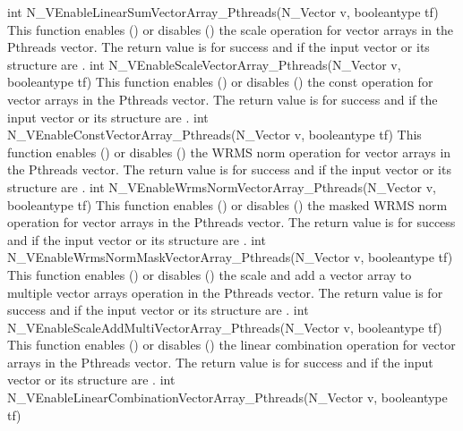 {
  int N\_VEnableLinearSumVectorArray\_Pthreads(N\_Vector v, booleantype tf)
}
{
  This function enables () or disables () the scale
  operation for vector arrays in the Pthreads vector. The return value is  for
  success and  if the input vector or its  structure are .
}
{
  int N\_VEnableScaleVectorArray\_Pthreads(N\_Vector v, booleantype tf)
}
{
  This function enables () or disables () the const
  operation for vector arrays in the Pthreads vector. The return value is  for
  success and  if the input vector or its  structure are .
}
{
  int N\_VEnableConstVectorArray\_Pthreads(N\_Vector v, booleantype tf)
}
{
  This function enables () or disables () the WRMS norm
  operation for vector arrays in the Pthreads vector. The return value is  for
  success and  if the input vector or its  structure are .
}
{
  int N\_VEnableWrmsNormVectorArray\_Pthreads(N\_Vector v, booleantype tf)
}
{
  This function enables () or disables () the masked WRMS
  norm operation for vector arrays in the Pthreads vector. The return value is
   for success and  if the input vector or its  structure are
  .
}
{
  int N\_VEnableWrmsNormMaskVectorArray\_Pthreads(N\_Vector v, booleantype tf)
}
{
  This function enables () or disables () the scale and
  add a vector array to multiple vector arrays operation in the Pthreads vector. The
  return value is  for success and  if the input vector or its
   structure are .
}
{
  int N\_VEnableScaleAddMultiVectorArray\_Pthreads(N\_Vector v, booleantype tf)
}
{
  This function enables () or disables () the linear
  combination operation for vector arrays in the Pthreads vector. The return value
  is  for success and  if the input vector or its  structure
  are .
}
{
  int N\_VEnableLinearCombinationVectorArray\_Pthreads(N\_Vector v, booleantype tf)
}
